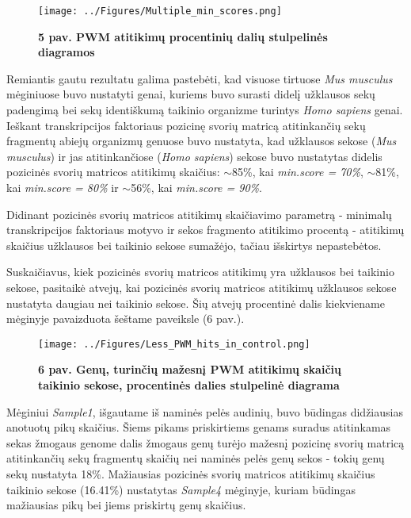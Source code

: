 \documentclass[12pt]{article}
\begin{document}
\begin{figure}[H]
    \begin{center}
        \texttt{[image: ../Figures/Multiple\_min\_scores.png]}
        \vspace{-1.5\baselineskip}
        \caption*{\small\textbf{5 pav. PWM atitikimų procentinių dalių
                                stulpelinės diagramos}}
    \end{center}
\end{figure}

Remiantis gautu rezultatu galima pastebėti, kad visuose tirtuose
\emph{Mus musculus} mėginiuose buvo nustatyti genai, kuriems buvo surasti didelį
užklausos sekų padengimą bei sekų identiškumą taikinio organizme turintys
\emph{Homo sapiens} genai. Ieškant transkripcijos faktoriaus pozicinę svorių
matricą atitinkančių sekų fragmentų abiejų organizmų genuose buvo nustatyta,
kad užklausos sekose (\emph{Mus musculus}) ir jas atitinkančiose
(\emph{Homo sapiens}) sekose buvo nustatytas didelis pozicinės svorių matricos
atitikimų skaičius: \(\sim\)85\%, kai \emph{min.score = 70\%}, \(\sim\)81\%,
kai \emph{min.score = 80\%} ir \(\sim\)56\%, kai \emph{min.score = 90\%}.

Didinant pozicinės svorių matricos atitikimų skaičiavimo parametrą - minimalų
transkripcijos faktoriaus motyvo ir sekos fragmento atitikimo procentą - 
atitikimų skaičius užklausos bei taikinio sekose sumažėjo, tačiau išskirtys
nepastebėtos.

Suskaičiavus, kiek pozicinės svorių matricos atitikimų yra užklausos bei
taikinio sekose, pasitaikė atvejų, kai pozicinės svorių matricos atitikimų
užklausos sekose nustatyta daugiau nei taikinio sekose. Šių atvejų procentinė
dalis kiekviename mėginyje pavaizduota šeštame paveiksle (6 pav.).

\begin{figure}[ht]
    \begin{center}
        \captionsetup{justification=centering}
        \texttt{[image: ../Figures/Less\_PWM\_hits\_in\_control.png]}
        \vspace{-1.5\baselineskip}
        \caption*{\small\textbf{6 pav. Genų, turinčių mažesnį PWM atitikimų 
                                skaičių taikinio sekose, procentinės dalies
                                stulpelinė diagrama}}
    \end{center}
\end{figure}

Mėginiui \emph{Sample1}, išgautame iš naminės pelės audinių, buvo būdingas
didžiausias anotuotų pikų skaičius. Šiems pikams priskirtiems genams suradus
atitinkamas sekas žmogaus genome dalis žmogaus genų turėjo
mažesnį pozicinę svorių matricą atitinkančių sekų fragmentų skaičių nei
naminės pelės genų sekos - tokių genų sekų nustatyta 18\%. Mažiausias pozicinės
svorių matricos atitikimų skaičius taikinio sekose (16.41\%) nustatytas
\emph{Sample4} mėginyje, kuriam būdingas mažiausias pikų bei jiems priskirtų
genų skaičius.
\end{document}
